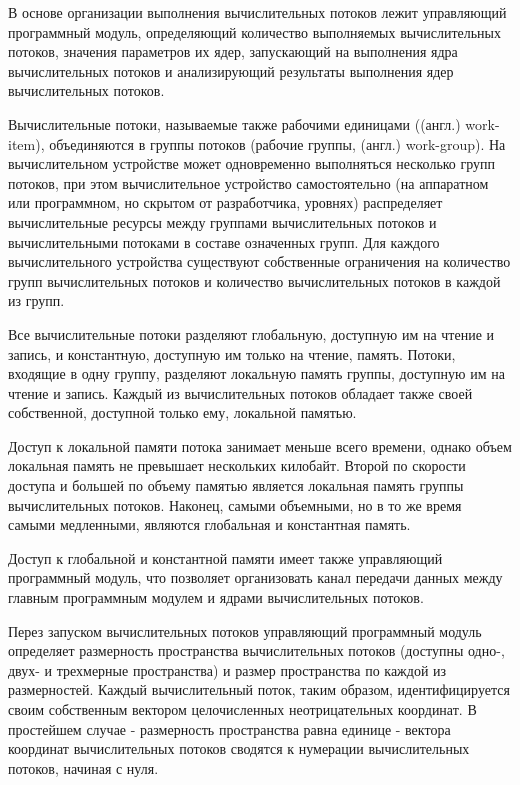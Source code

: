 В основе организации выполнения вычислительных потоков лежит управляющий программный модуль, определяющий количество выполняемых вычислительных потоков, значения параметров их ядер, запускающий на выполнения ядра вычислительных потоков и анализирующий результаты выполнения ядер вычислительных потоков.

Вычислительные потоки, называемые также рабочими единицами ((англ.) work-item), объединяются в группы потоков (рабочие группы, (англ.) work-group). На вычислительном устройстве может одновременно выполняться несколько групп потоков, при этом вычислительное устройство самостоятельно (на аппаратном или программном, но скрытом от разработчика, уровнях) распределяет вычислительные ресурсы между группами вычислительных потоков и вычислительными потоками в составе означенных групп. Для каждого вычислительного устройства существуют собственные ограничения на количество групп вычислительных потоков и количество вычислительных потоков в каждой из групп.

Все вычислительные потоки разделяют глобальную, доступную им на чтение и запись, и константную, доступную им только на чтение, память. Потоки, входящие в одну группу, разделяют локальную память группы, доступную им на чтение и запись. Каждый из вычислительных потоков обладает также своей собственной, доступной только ему, локальной памятью.

Доступ к локальной памяти потока занимает меньше всего времени, однако объем локальная память не превышает нескольких килобайт. Второй по скорости доступа и большей по объему памятью является локальная память группы вычислительных потоков. Наконец, самыми объемными, но в то же время самыми медленными, являются глобальная и константная память.

Доступ к глобальной и константной памяти имеет также управляющий программный модуль, что позволяет организовать канал передачи данных между главным программным модулем и ядрами вычислительных потоков.

Перез запуском вычислительных потоков управляющий программный модуль определяет размерность пространства вычислительных потоков (доступны одно-, двух- и трехмерные пространства) и размер пространства по каждой из размерностей. Каждый вычислительный поток, таким образом, идентифицируется своим собственным вектором целочисленных неотрицательных координат. В простейшем случае - размерность пространства равна единице - вектора координат вычислительных потоков сводятся к нумерации вычислительных потоков, начиная с нуля.

